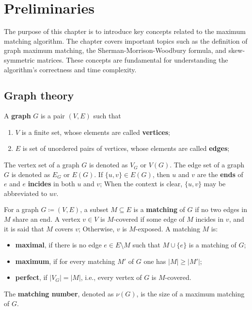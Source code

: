 \renewcommand*{\proofname}{Proof}

\chapter{Preliminaries}
\label{chap:preliminaries}

The purpose of this chapter is to introduce key concepts related to the maximum matching algorithm. 
The chapter covers important topics such as the definition of graph maximum matching, the Sherman-Morrison-Woodbury formula, and skew-symmetric matrices. 
These concepts are fundamental for understanding the algorithm's correctness and time complexity.

\enlargethispage{.5\baselineskip}

\section{Graph theory}
\label{sec:graph}

\begin{definition}[Graph]
\label{def:graph}
	A \textbf{graph} \(G\) is a pair \((V, E)\) such that
	\begin{enumerate}[label=(\roman*)]
		\item \(V\) is a finite set, whose elements are called \textbf{vertices};
		\item \(E\) is set of unordered pairs of vertices, whose elements are called \textbf{edges};
	\end{enumerate}
\end{definition}
\noindent
The vertex set of a graph \(G\) is denoted as \(V_G\) or \(V(G)\).
The edge set of a graph \(G\) is denoted as \(E_G\) or \(E(G)\).
If \(\{u,v\} \in E(G)\), then \(u\) and \(v\) are the \textbf{ends} of \(e\) and \(e\) \textbf{incides} in both \(u\) and \(v\);
When the context is clear, \(\{u, v\}\) may be abbreviated to \(uv\).

\begin{definition}[Matching]
\label{def:matching}
	For a graph \(G \coloneqq (V, E)\), a subset \(M \subseteq E\) is a \textbf{matching} of \(G\) if no two edges in \(M\) share an end.
	A vertex \(v \in V\) is \(M\)-covered if some edge of \(M\) incides in \(v\), 
	and it is said that \(M\) covers \(v\);
	Otherwise, \(v\) is \(M\)-exposed.
	A matching \(M\) is:
	\begin{itemize}
		\item 
			\textbf{maximal}, if there is no edge \(e \in E \setminus M\) such that \(M \cup \{e\}\) is a matching of \(G\);
		\item
			\textbf{maximum}, if for every matching \(M'\) of \(G\) one has \(|M| \geq |M'|\);
		\item
			\textbf{perfect}, if \(|V_G| = |M|\), i.e., every vertex of \(G\) is \(M\)-covered.
	\end{itemize}
	The \textbf{matching number}, denoted as \(\nu(G)\), is the size of a maximum matching of \(G\).
\end{definition}

